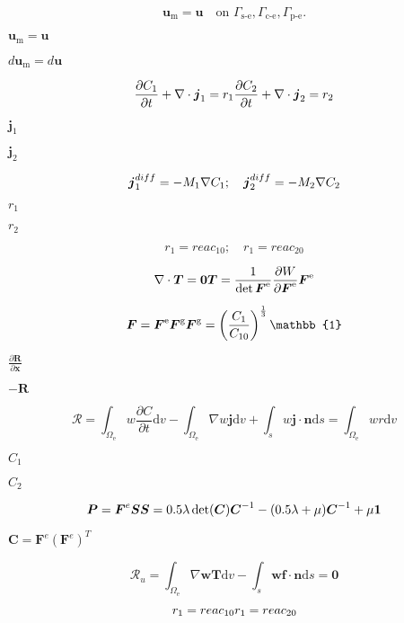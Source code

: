 \documentclass{article}
\begin{document}
\[ \boldsymbol{u}_\text{m}=\boldsymbol{u} \quad \text{on } \Gamma_\text{s-e}, \Gamma_\text{c-e}, \Gamma_\text{p-e}. \]
\pagebreak

$\boldsymbol{u}_\text{m}=\boldsymbol{u}$
\pagebreak

$d\boldsymbol{u}_\text{m}=d\boldsymbol{u}$
\pagebreak

\[ \frac{\partial C_\text{1}}{\partial t}+\nabla\cdot\boldsymbol{j}_1=r_1 \\ \frac{\partial C_\text{2}}{\partial t}+\nabla\cdot\boldsymbol{j}_2=r_2 \]
\pagebreak

$\boldsymbol{j}_1 $
\pagebreak

$\boldsymbol{j}_2 $
\pagebreak

\[ \boldsymbol{j}_1^{diff}=-M_1\nabla C_\text{1}; \quad \boldsymbol{j}_2^{diff}=-M_2\nabla C_\text{2}\\ \]
\pagebreak

$r_1$
\pagebreak

$r_2$
\pagebreak

\[ r_1= reac_{10}; \quad r_1= reac_{20} \]
\pagebreak

\[ \nabla\cdot\boldsymbol{T} = \boldsymbol{0}\\ \boldsymbol{T}= \frac{1}{\det{\boldsymbol{F}^{\text{e}}}}\frac{\partial W}{\partial \boldsymbol{F}^{\text{e}}}\boldsymbol{F}^{\text{e}} \]
\pagebreak

\[ \boldsymbol{F}=\boldsymbol{F}^{\text{e}}\boldsymbol{F}^{\text{g}}\\ \boldsymbol{F}^{\text{g}}=\left(\frac{C_\text{1}}{C_\text{10}}\right)^{\frac{1}{3}}\mathbb{1} \]
\pagebreak

$\frac{\partial \boldsymbol{R}}{\partial \boldsymbol{x}} $
\pagebreak

$-\boldsymbol{R}$
\pagebreak

\[ \mathscr{R}=\int_{\Omega_{\text{e}}}w\frac{\partial C}{\partial t}\text{d}v-\int_{\Omega_{\text{e}}} \nabla w \boldsymbol{j} \text{d}v+\int_{s}w\boldsymbol{j}\cdot\boldsymbol{n} \text{d}s=\int_{\Omega_{\text{e}}}w r \text{d}v \]
\pagebreak

$C_\text{1}$
\pagebreak

$C_\text{2}$
\pagebreak

\[ \boldsymbol{P}=\boldsymbol{F}^e\boldsymbol{S}\\ \boldsymbol{S}=0.5\lambda\det(\boldsymbol{C})\boldsymbol{C}^{-1}-(0.5\lambda+\mu)\boldsymbol{C}^{-1}+\mu\boldsymbol{1} \]
\pagebreak

$\boldsymbol{C}=\boldsymbol{F}^e(\boldsymbol{F}^e)^{T}$
\pagebreak

\[ \mathscr{R}_u=\int_{\Omega_{\text{e}}}\nabla \boldsymbol{w}\boldsymbol{T} \text{d}v- \int_{s}\boldsymbol{w} \boldsymbol{f} \cdot \boldsymbol{n} \text{d}s = \boldsymbol{0} \]
\pagebreak

\[ r_1= reac_{10} \\ r_1= reac_{20} \]
\pagebreak
\end{document}
